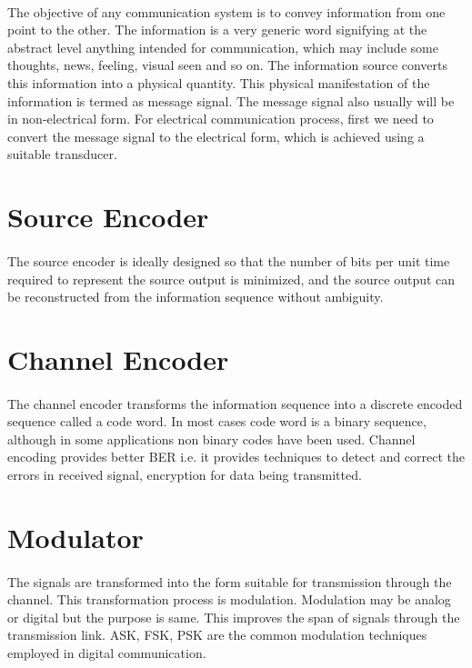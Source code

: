 \documentclass[14pt]{report}
\begin{document}
{\paragraph{} The objective of any communication system is to convey information from one point to the other. The information is a very generic word signifying at the abstract level anything intended for communication, which may include some thoughts, news, feeling, visual seen and so on. The information source converts this information into a physical quantity. This physical manifestation of the information is termed as message signal. The message signal also usually will be in non-electrical form. For electrical communication process, first we need to convert the message signal to the electrical form, which is achieved using a suitable transducer.
\section{Source Encoder}
\paragraph{}The source encoder is ideally designed so that the number of bits per unit time required to represent the source output is minimized, and the source output can be reconstructed from the information sequence without ambiguity. 
\section{Channel Encoder}
\paragraph{}The channel encoder transforms the information sequence into a discrete encoded sequence called a code word. In most cases code word is a binary sequence, although in some applications non binary codes have been used. Channel encoding provides better BER i.e. it provides techniques to detect and correct the errors in received signal, encryption for data being transmitted.
\section{Modulator}
\paragraph{}The signals are transformed into the form suitable for transmission through the channel. This transformation process is modulation. Modulation may be analog or digital but the purpose is same. This improves the span of signals through the transmission link. ASK, FSK, PSK are the common modulation techniques employed in digital communication.
}
\end{document}
